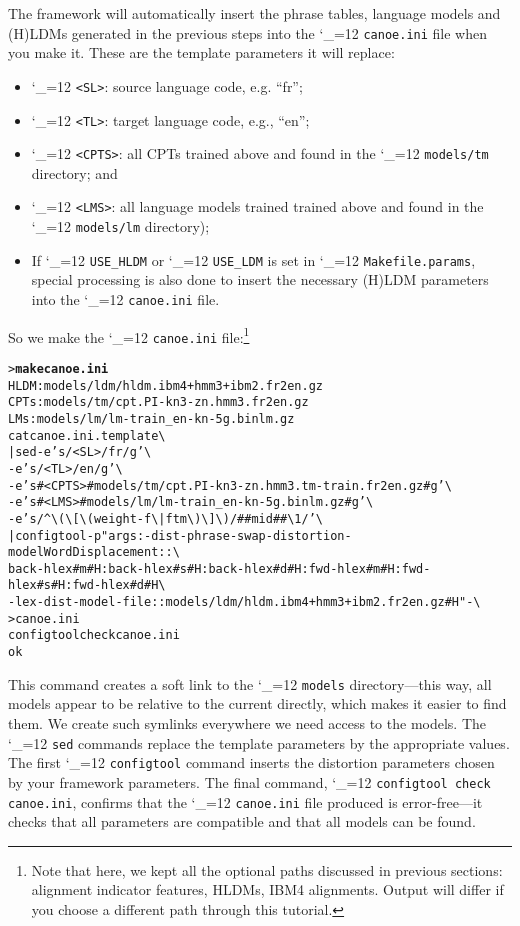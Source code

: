 \documentclass[11pt,letterpaper]{article}
\newcommand{\bs}{\textbackslash{}}
\def\code{\begingroup\catcode`\_=12 \codex}
\newcommand{\codex}[1]{\texttt{#1}\endgroup}
\begin{document}
The framework will automatically insert the phrase tables, language models
and (H)LDMs generated in the previous steps into the \code{canoe.ini} file when
you make it.  These are the template parameters it will replace:
\begin{itemize}
\item \code{<SL>}:   source language code, e.g. ``fr'';
\item \code{<TL>}:   target language code, e.g., ``en'';
\item \code{<CPTS>}: all CPTs trained above and found in the
                     \code{models/tm} directory; and
\item \code{<LMS>}:  all language models trained trained above and found in
                     the \code{models/lm} directory);
\item If \code{USE_HLDM} or \code{USE_LDM} is set in \code{Makefile.params},
special processing is also done to insert the necessary (H)LDM parameters into
the \code{canoe.ini} file.
\end{itemize}

So we make the \code{canoe.ini} file:\footnote{Note that here, we kept all the
optional paths discussed in previous sections: alignment indicator features,
HLDMs, IBM4 alignments.  Output will differ if you choose a different path
through this tutorial.}
\begin{small}
\begin{alltt}
   > \textbf{make canoe.ini}
   HLDM: models/ldm/hldm.ibm4+hmm3+ibm2.fr2en.gz
   CPTs: models/tm/cpt.PI-kn3-zn.hmm3.fr2en.gz
   LMs: models/lm/lm-train_en-kn-5g.binlm.gz
   cat canoe.ini.template \bs
      | sed -e 's/<SL>/fr/g' \bs
            -e 's/<TL>/en/g' \bs
            -e 's#<CPTS>#models/tm/cpt.PI-kn3-zn.hmm3.tm-train.fr2en.gz#g' \bs
            -e 's#<LMS>#models/lm/lm-train_en-kn-5g.binlm.gz#g' \bs
            -e 's/^\bs(\bs[\bs(weight-f\bs|ftm\bs)\bs]\bs)/##mid##\bs1/' \bs
      | configtool -p "args:-dist-phrase-swap -distortion-model WordDisplacement::\bs
        back-hlex#m#H:back-hlex#s#H:back-hlex#d#H:fwd-hlex#m#H:fwd-hlex#s#H:fwd-hlex#d#H\bs
        -lex-dist-model-file ::models/ldm/hldm.ibm4+hmm3+ibm2.fr2en.gz#H " - \bs
      > canoe.ini
   configtool check canoe.ini
   ok
\end{alltt}
\end{small}
This command creates a soft link to the \code{models} directory---this way, all
models appear to be relative to the current directly, which makes it easier to
find them.  We create such symlinks everywhere we need access to the models.
The \code{sed} commands replace the template parameters by the appropriate
values.  The first \code{configtool} command inserts the distortion parameters
chosen by your framework parameters.  The final command, \code{configtool check
canoe.ini}, confirms that the \code{canoe.ini} file produced is error-free---it
checks that all parameters are compatible and that all models can be found.
\end{document}

